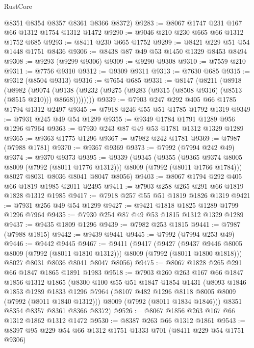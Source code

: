 \begin{lexlean}{RustCore}
\begin{coremodule}
      @8351
      @8354
      @8357
      @8361
      @8366
      @8372)
@9283 := @8067 @1747 @231 @167 @66 @1312 @1754 @1312 @1472
@9290 := @9046 @210 @230 @665 @66 @1312 @1752 @685
@9293 := @8411 @230 @665 @1752
@9299 := @8421 @229 @51 @54 @1448 @1751 @8436
@9306 := @8438 @87 @49 @53 @1450 @1329 @8453 @8494
@9308 := @9293 (@9299 @9306)
@9309 := @9290 @9308
@9310 := @7559 @210
@9311 := @7756 @9310
@9312 := @9309 @9311
@9313 := @7630 @685
@9315 := @9312 (@8504 @9313)
@9316 := @7654 @685
@9331 := @8147
    (@8211
      (@8918
        (@8982
          (@9074
            (@9138 (@9232 (@9275 (@9283 (@9315 (@8508 @9316) (@8513 (@8515 @210))) @8668))))))))
@9339 := @7903 @247 @292 @405 @66 @1785 @1794 @1312 @2497
@9345 := @7918 @246 @55 @51 @1785 @1792 @1319
@9349 := @7931 @245 @49 @54 @1299
@9355 := @9349 @1784 @1791 @1289 @956 @1296 @7964
@9363 := @7930 @243 @87 @49 @53 @1781 @1312 @1329 @1289
@9365 := @9363 @1775 @1296
@9367 := @7982 @242 @1781
@9369 := @7987 (@7988 @1781)
@9370 := @9367 @9369
@9373 := @7992 (@7994 @242 @49)
@9374 := @9370 @9373
@9395 := @9339
    (@9345
      (@9355
        (@9365 @9374 @8005 @8009 (@7992 (@8011 @1776 @1312)))
        @8009
        (@7992 (@8011 @1766 @1784)))
      @8027
      @8031
      @8036
      @8041
      @8047
      @8056)
@9403 := @8067 @1794 @292 @405 @66 @1819 @1985 @2011 @2495
@9411 := @7903 @258 @265 @291 @66 @1819 @1828 @1312 @1985
@9417 := @7918 @257 @55 @51 @1819 @1826 @1319
@9421 := @7931 @256 @49 @54 @1299
@9427 := @9421 @1818 @1825 @1289 @1799 @1296 @7964
@9435 := @7930 @254 @87 @49 @53 @1815 @1312 @1329 @1289
@9437 := @9435 @1809 @1296
@9439 := @7982 @253 @1815
@9441 := @7987 (@7988 @1815)
@9442 := @9439 @9441
@9445 := @7992 (@7994 @253 @49)
@9446 := @9442 @9445
@9467 := @9411
    (@9417
      (@9427
        (@9437 @9446 @8005 @8009 (@7992 (@8011 @1810 @1312)))
        @8009
        (@7992 (@8011 @1800 @1818)))
      @8027
      @8031
      @8036
      @8041
      @8047
      @8056)
@9475 := @8067 @1828 @265 @291 @66 @1847 @1865 @1891 @1983
@9518 := @7903
    @260
    @263
    @167
    @66
    @1847
    @1856
    @1312
    @1865
    (@8300
      @100
      @55
      @51
      @1847
      @1854
      @1431
      (@8093
        @1846
        @1853
        @1289
        @1833
        @1296
        @7964
        (@8107 @482 @1296 @8118 @8005 @8009 (@7992 (@8011 @1840 @1312)))
        @8009
        (@7992 (@8011 @1834 @1846)))
      @8351
      @8354
      @8357
      @8361
      @8366
      @8372)
@9526 := @8067 @1856 @263 @167 @66 @1312 @1862 @1312 @1472
@9530 := @8387 @263 @66 @1312 @1861
@9543 := @8397 @95 @229 @54 @66 @1312 @1751 @1333 @701 (@8411 @229 @54 @1751 @9306)

\end{coremodule}
\end{lexlean}
